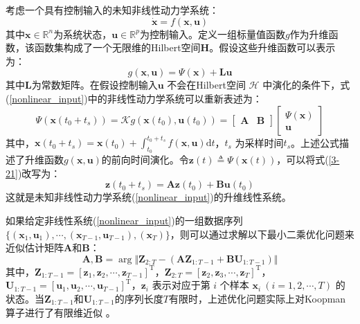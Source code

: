 \documentclass[lang=chs, degree=master, blindreview=false, winfonts=true]{yanputhesis}
\begin{document}
考虑一个具有控制输入的未知非线性动力学系统： 
\begin{equation} 
	\dot{\bm{x}} = {f}(\bm{x},\bm{u}) \label{nonlinear_input} \end{equation} 
其中$\bm{x} \in \mathbb{R}^n$为系统状态，$\bm{u} \in \mathbb{R}^p$为控制输入。定义一组标量值函数${g}$作为升维函数，该函数集构成了一个无限维的Hilbert空间$\mathcal{\bm H}$。假设这些升维函数可以表示为： 
\begin{equation} 
	{g}(\bm{x},\bm{u}) = {\Psi}(\bm{x}) + \bm{L}\bm{u} 
\end{equation} 
其中$\bm{L}$为常数矩阵。在假设控制输入$\bm{u}$ 不会在Hilbert空间 $\mathcal{H}$ 中演化的条件下，式(\ref{nonlinear_input})中的非线性动力学系统可以重新表述为： 
\begin{equation} 
	{\Psi}(\bm{x}(t_0+t_s)) = {\mathcal{K}} {g}(\bm{x}(t_0), \bm{u}(t_0)) = \begin{bmatrix}\bm A&\bm B\end{bmatrix}\begin{bmatrix}\Psi(\bm x)\\\bm u\end{bmatrix}
\label{3-21} 
\end{equation} 
其中，$\bm{x}(t_0+t_s)=\bm{x}(t_0)+\int_{t_0}^{t_0+t_s}{f}(\bm{x},\bm{u}){\mathrm{d}t}$，$t_s$ 为采样时间$t_s$。上述公式描述了升维函数${g}(\bm{x},\bm{u})$的前向时间演化。令$\bm{z}(t) \triangleq {\Psi}(\bm{x}(t))$，可以将式(\ref{3-21})改写为： 
\begin{equation} \bm{z}(t_0 + t_s) = \bm{A}\bm{z}(t_0) + \bm{B}\bm{u}(t_0) \label{lls} 
\end{equation} 
这就是未知非线性动力学系统(\ref{nonlinear_input})的升维线性系统。

如果给定非线性系统(\ref{nonlinear_input})的一组数据序列 $\{(\bm{x}_1,\bm{u}_1),\cdots,(\bm{x}_{T-1},\bm{u}_{T-1}),(\bm{x}_T)\}$，则可以通过求解以下最小二乘优化问题来近似估计矩阵$\bm{A}$和$\bm{B}$：
\begin{equation}
	\bm{A},\bm{B} = \mathop{\arg\min\limits_{\bm{A},\bm{B}}} \Vert \bm{Z}_{2:T} - (\bm{A}\bm{Z}_{1:T-1}+\bm{B}\bm{U}_{1:T-1}) \Vert \label{LS_AB}
\end{equation} 
其中，$\bm{Z}_{1:T-1}= [ \bm{z}_1,\bm{z}_2,\cdots,\bm{z}_{T-1} ]^\mathrm{T}$，$\bm{Z}_{2:T}= [\bm{z}_2,\bm{z}_3,\cdots,\bm{z}_{T}]^\mathrm{T}$，$\bm{U}_{1:T-1}= [\bm{u}_1,\bm{u}_2,\cdots,\bm{u}_{T-1}]^\mathrm{T}$，$\bm{z}_i$ 表示对应于第 $i$ 个样本 $\bm{x}_i\ (i=1,2,\cdots,T)$ 的状态。当$\bm{Z}_{1:T-1}$和$\bm{U}_{1:T-1}$的序列长度$T$有限时，上述优化问题实际上对Koopman算子进行了有限维近似 \cite{Hao2024}。
\end{document}
